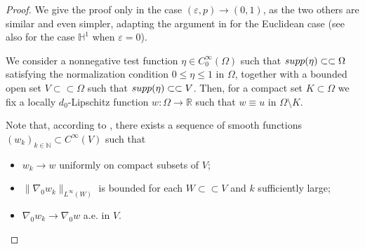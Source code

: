 \documentclass[10pt]{amsart}
\numberwithin{equation}{section}
\theoremstyle{definition}
\newcommand{\He}{\mathbb{H}}
\begin{document}
\begin{proof} We give the proof only in the case   $(\varepsilon,p) \to (0,1)$, as the two others are similar and even simpler, adapting the argument in \cite{Moser} for the Euclidean case (see also \cite{CuiZhao} for the case $\He^1$ when $\varepsilon=0$).

  We consider a nonnegative test function $\eta \in C^{\infty}_{0}(\Omega)$ such that $\rm{supp}(\eta)\subset\subset \Omega$ satisfying the normalization condition
$0\leq \eta\leq 1$ in $\Omega$, together with a bounded open set $V \subset \subset \Omega$ such that $\rm{supp}(\eta)\subset\subset V$. Then, for a compact set $K \subset \Omega$  we fix a locally $d_{0}$-Lipschitz function $w:\Omega \to \mathbb{R}$ such that $w \equiv u$ in $\Omega \setminus K$.
 


 
 Note that, according to \cite[Theorem 2.15]{ComiMagnani}, there exists a sequence of smooth functions $(w_{k})_{k\in\mathbb{N}} \subset C^{\infty}(V)$ such that 
\begin{itemize}
\item[i)] $w_k \to w$ uniformly on compact subsets of $V$;
\item[ii)] $\|\nabla_{0}w_k\|_{L^{\infty}(W)}$ is bounded for each $W\subset\subset V$ and $k$ sufficiently large;
\item[iii)] $\nabla_{0}w_k \to \nabla_{0}w$ a.e. in $V$.
\end{itemize}


\end{proof}
\end{document}
